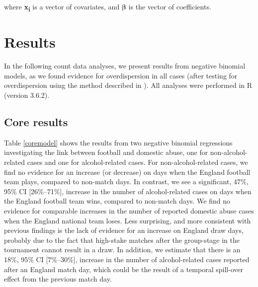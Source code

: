 \documentclass[12pt, a4paper]{article}
\begin{document}
where \textbf{x\textsubscript{i}} is a vector of covariates, and $\boldsymbol{\beta}$ is the vector of coefficients.


\newpage

\section{Results}

In the following count data analyses, we present results from negative binomial models, as we found evidence for overdispersion in all cases (after testing for overdispersion using the method described in ). All analyses were performed in R (version 3.6.2).


\subsection{Core results} 

Table \ref{coremodel} shows the results from two negative binomial regressions investigating the link between football and domestic abuse, one for non-alcohol-related cases and one for alcohol-related cases. For non-alcohol-related cases, we find no evidence for an increase (or decrease) on days when the England football team plays, compared to non-match days. In contrast, we see a significant, 47\%, 95\% CI [26\%--71\%], increase in the number of alcohol-related cases on days when the England football team wins, compared to non-match days. We find no evidence for comparable increases in the number of reported domestic abuse cases when the England national team loses. Less surprising, and more consistent with previous findings is the lack of evidence for an increase on England draw days, probably due to the fact that high-stake matches after the group-stage in the tournament cannot result in a draw. In addition, we estimate that there is an 18\%, 95\% CI [7\%--30\%], increase in the number of alcohol-related cases reported after an England match day, which could be the result of a temporal spill-over effect from the previous match day. 
\end{document}
